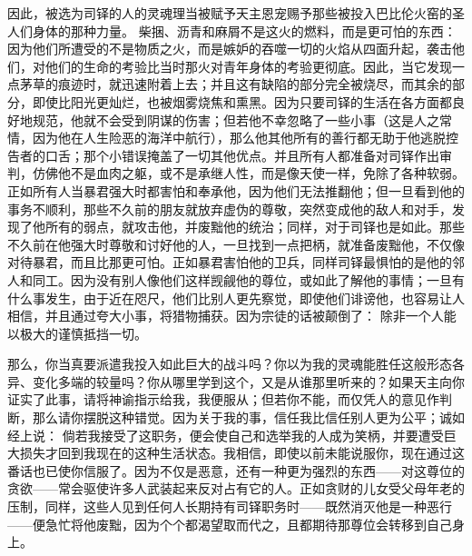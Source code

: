 因此，被选为司铎的人的灵魂理当被赋予天主恩宠赐予那些被投入巴比伦火窑的圣人们身体的那种力量。 柴捆、沥青和麻屑不是这火的燃料，而是更可怕的东西：因为他们所遭受的不是物质之火，而是嫉妒的吞噬一切的火焰从四面升起，袭击他们，对他们的生命的考验比当时那火对青年身体的考验更彻底。因此，当它发现一点茅草的痕迹时，就迅速附着上去；并且这有缺陷的部分完全被烧尽，而其余的部分，即使比阳光更灿烂，也被烟雾烧焦和熏黑。因为只要司铎的生活在各方面都良好地规范，他就不会受到阴谋的伤害；但若他不幸忽略了一些小事（这是人之常情，因为他在人生险恶的海洋中航行），那么他其他所有的善行都无助于他逃脱控告者的口舌；那个小错误掩盖了一切其他优点。并且所有人都准备对司铎作出审判，仿佛他不是血肉之躯，或不是承继人性，而是像天使一样，免除了各种软弱。正如所有人当暴君强大时都害怕和奉承他，因为他们无法推翻他；但一旦看到他的事务不顺利，那些不久前的朋友就放弃虚伪的尊敬，突然变成他的敌人和对手，发现了他所有的弱点，就攻击他，并废黜他的统治；同样，对于司铎也是如此。那些不久前在他强大时尊敬和讨好他的人，一旦找到一点把柄，就准备废黜他，不仅像对待暴君，而且比那更可怕。正如暴君害怕他的卫兵，同样司铎最惧怕的是他的邻人和同工。因为没有别人像他们这样觊觎他的尊位，或如此了解他的事情；一旦有什么事发生，由于近在咫尺，他们比别人更先察觉，即使他们诽谤他，也容易让人相信，并且通过夸大小事，将猎物捕获。因为宗徒的话被颠倒了： 除非一个人能以极大的谨慎抵挡一切。\par

那么，你当真要派遣我投入如此巨大的战斗吗？你以为我的灵魂能胜任这般形态各异、变化多端的较量吗？你从哪里学到这个，又是从谁那里听来的？如果天主向你证实了此事，请将神谕指示给我，我便服从；但若你不能，而仅凭人的意见作判断，那么请你摆脱这种错觉。因为关于我的事，信任我比信任别人更为公平；诚如经上说： 倘若我接受了这职务，便会使自己和选举我的人成为笑柄，并要遭受巨大损失才回到我现在的这种生活状态。我相信，即使以前未能说服你，现在通过这番话也已使你信服了。因为不仅是恶意，还有一种更为强烈的东西——对这尊位的贪欲——常会驱使许多人武装起来反对占有它的人。正如贪财的儿女受父母年老的压制，同样，这些人见到任何人长期持有司铎职务时——既然消灭他是一种恶行——便急忙将他废黜，因为个个都渴望取而代之，且都期待那尊位会转移到自己身上。\par

